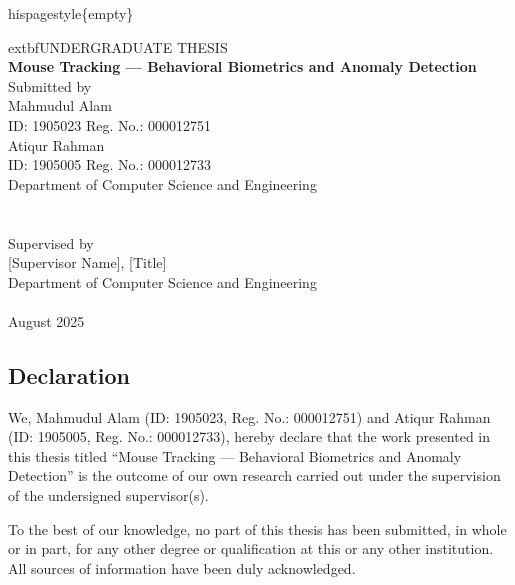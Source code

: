 \documentclass[
  12pt,
]{article}
\author{}
\date{}
\begin{document}
{
\setcounter{tocdepth}{3}
\tableofcontents
}
\newpage

hispagestyle\{empty\}

\begin{center}
extbf{UNDERGRADUATE THESIS}\\[1.5cm]

{\LARGE \textbf{Mouse Tracking --- Behavioral Biometrics and Anomaly Detection}}\\[1.2cm]

Submitted by\\[0.6cm]
Mahmudul Alam\\
ID: 1905023 \quad\textbullet\quad Reg. No.: 000012751\\[0.4cm]
Atiqur Rahman\\
ID: 1905005 \quad\textbullet\quad Reg. No.: 000012733\\[1cm]

Department of Computer Science and Engineering\\
[University/Institute Name --- update here]\\
[City, Country]\\[1cm]

Supervised by\\[0.3cm]
[Supervisor Name], [Title]\\
Department of Computer Science and Engineering\\
[University/Institute Name]\\[1.5cm]

August 2025
\end{center}

\newpage

\newpage

\subsection{Declaration}\label{declaration}

We, Mahmudul Alam (ID: 1905023, Reg. No.: 000012751) and Atiqur Rahman
(ID: 1905005, Reg. No.: 000012733), hereby declare that the work
presented in this thesis titled ``Mouse Tracking --- Behavioral
Biometrics and Anomaly Detection'' is the outcome of our own research
carried out under the supervision of the undersigned supervisor(s).

To the best of our knowledge, no part of this thesis has been submitted,
in whole or in part, for any other degree or qualification at this or
any other institution. All sources of information have been duly
acknowledged.
\end{document}
